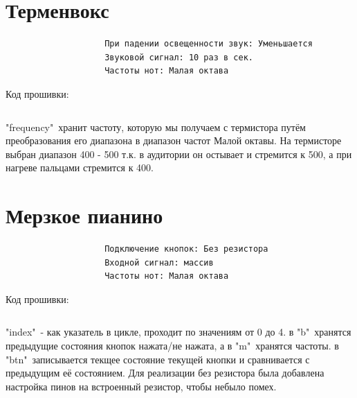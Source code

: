 \section{Терменвокс}
\begin{verbatim}
					При падении освещенности звук: Уменьшается
					Звуковой сигнал: 10 раз в сек.
					Частоты нот: Малая октава
\end{verbatim}
Код прошивки:
\inputminted{cpp}{z5/main.cpp}
"frequency"\ хранит частоту, которую мы получаем с термистора путём преобразования его диапазона в диапазон частот Малой октавы. На термисторе выбран диапазон 400 - 500 т.к. в аудитории он остывает и стремится к 500, а при нагреве пальцами стремится к 400.
\section{Мерзкое пианино}
\begin{verbatim}
					Подключение кнопок: Без резистора
					Входной сигнал: массив
					Частоты нот: Малая октава
\end{verbatim}
Код прошивки:
\inputminted{cpp}{z6/main.cpp}
"index"\ - как указатель в цикле, проходит по значениям от 0 до 4. в "b"\ хранятся предыдущие состояния кнопок нажата/не нажата, а в "m"\ хранятся частоты. в "btn"\ записывается текщее состояние текущей кнопки и сравнивается с предыдущим её состоянием. Для реализации без резистора была добавлена настройка пинов на встроенный резистор, чтобы небыло помех.